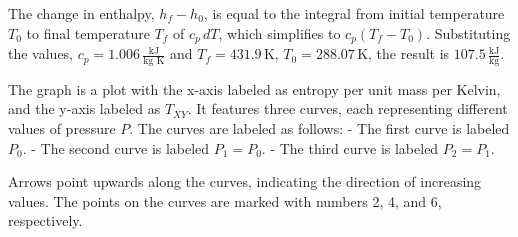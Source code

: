 The change in enthalpy, \( h_f - h_0 \), is equal to the integral from initial temperature \( T_0 \) to final temperature \( T_f \) of \( c_p \, dT \), which simplifies to \( c_p (T_f - T_0) \). Substituting the values, \( c_p = 1.006 \, \frac{\text{kJ}}{\text{kg K}} \) and \( T_f = 431.9 \, \text{K} \), \( T_0 = 288.07 \, \text{K} \), the result is \( 107.5 \, \frac{\text{kJ}}{\text{kg}} \).

The graph is a plot with the x-axis labeled as entropy per unit mass per Kelvin, and the y-axis labeled as \( T_{XY} \). It features three curves, each representing different values of pressure \( P \). The curves are labeled as follows:
- The first curve is labeled \( P_0 \).
- The second curve is labeled \( P_1 = P_0 \).
- The third curve is labeled \( P_2 = P_1 \).

Arrows point upwards along the curves, indicating the direction of increasing values. The points on the curves are marked with numbers 2, 4, and 6, respectively.